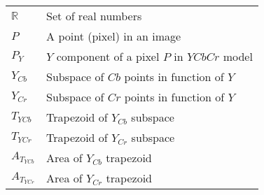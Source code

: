 \documentclass[11pt,twoside,a4paper]{book}
\theoremstyle{plain}
\theoremstyle{definition}
\begin{document}
\begin{tabular}{ll}
    $\mathbb{R}$& Set of real numbers \\
    $P$         & A point (pixel) in an image \\
    $P_Y$       & $Y$ component of a pixel $P$ in $YCbCr$ model \\
    $Y_{Cb}$    & Subspace of $Cb$ points in function of $Y$ \\
    $Y_{Cr}$    & Subspace of $Cr$ points in function of $Y$ \\
    $T_{YCb}$   & Trapezoid of $Y_{Cb}$ subspace \\
    $T_{YCr}$   & Trapezoid of $Y_{Cr}$ subspace \\
    $A_{T_{YCb}}$& Area of $Y_{Cb}$ trapezoid \\
    $A_{T_{YCr}}$& Area of $Y_{Cr}$ trapezoid \\
\end{tabular}
\clearpage
\end{document}
